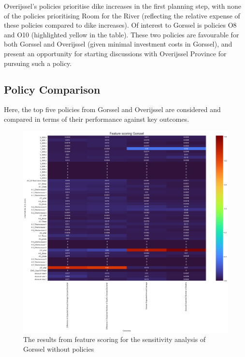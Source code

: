 \noindent Overijssel's policies prioritise dike increases in the first planning step, with none of the policies prioritising Room for the River (reflecting the relative expense of these policies compared to dike increases). Of interest to Gorssel is policies O8 and O10 (highlighted yellow in the table). These two policies are favourable for both Gorssel and Overijssel (given minimal investment costs in Gorssel), and present an opportunity for starting discussions with Overijssel Province for pursuing such a policy.

\subsection{Policy Comparison}
Here, the top five policies from Gorssel and Overijssel are considered and compared in terms of their performance against key outcomes.

\begin{figure}[h!]
    \centering
    \includegraphics[width=\textwidth]{report/figures/results/sa_model_Gorssel.png}
    \caption{The results from feature scoring for the sensitivity analysis of Gorssel without policies}
    \label{fig:feat-scor-g-wo}
\end{figure}

